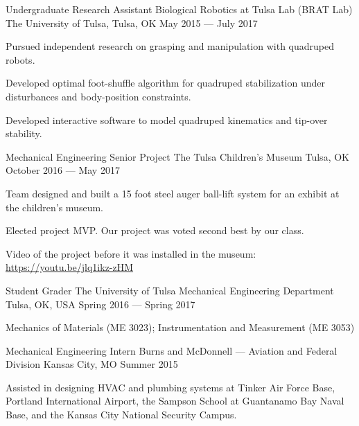 \begin{cventries}
  \cventry
    {Undergraduate Research Assistant} %
    {Biological Robotics at Tulsa Lab (BRAT Lab)} %
    {The University of Tulsa, Tulsa, OK} %
    {May 2015 --- July 2017} %
    {
      \begin{cvitems} %
        \item {Pursued independent research on grasping and manipulation with quadruped robots.}
        \item {Developed optimal foot-shuffle algorithm for quadruped stabilization under disturbances and body-position constraints.}
        \item {Developed interactive software to model quadruped kinematics and tip-over stability.}
      \end{cvitems}
    }

\cventry
{Mechanical Engineering Senior Project} %
{The Tulsa Children's Museum} %
{Tulsa, OK} %
{October 2016 --- May 2017} %
{
	\begin{cvitems} %
		\item{Team designed and built a 15 foot steel auger ball-lift system for an exhibit at the children's museum.}
		\item{Elected project MVP. Our project was voted second best by our class.}
		\item{Video of the project before it was installed in the museum: \href{https://youtu.be/jlq1ikz-zHM}{\color{awesome} https://youtu.be/jlq1ikz-zHM}}
	\end{cvitems}
}

\cventry
{Student Grader} %
{The University of Tulsa Mechanical Engineering Department} %
{Tulsa, OK, USA} %
{Spring 2016 --- Spring 2017} %
{
	\begin{cvitems} %
		\item{Mechanics of Materials (ME 3023); Instrumentation and Measurement (ME 3053)}
	\end{cvitems}
}

\cventry
{Mechanical Engineering Intern} %
{Burns and McDonnell --- Aviation and Federal Division} %
{Kansas City, MO} %
{Summer 2015} %
{
	\begin{cvitems} %
		\item{Assisted in designing HVAC and plumbing systems at Tinker Air Force Base, Portland International Airport, the Sampson School at Guantanamo Bay Naval Base, and the Kansas City National Security Campus.}
	\end{cvitems}
}


\end{cventries}
